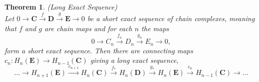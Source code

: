 \documentclass[11.5pt, twoside, a4paper, titlepage]{report}
\theoremstyle{definition}
\theoremstyle{plain}
\newtheorem{thm}[mydef]{Theorem}
\begin{document}
\begin{thm} (Long Exact Sequence) \label{longexactseqthm} \\
Let $0\xrightarrow{}\mathbf{C} \xrightarrow{f} \mathbf{D} \xrightarrow{g} \mathbf{E} \xrightarrow{}0$ be a short exact sequence of chain complexes, meaning that $f$ and $g$ are chain maps and for each $n$ the maps
\begin{equation*}
0 \xrightarrow{} C_n \xrightarrow{f_n} D_n \xrightarrow{g_n} E_n \xrightarrow{} 0,
\end{equation*}
form a short exact sequence. Then there are connecting maps $c_n:H_n(\mathbf{E}) \to H_{n-1}(\mathbf{C})$ giving a long exact sequence, 
\begin{equation*}
\dots \xrightarrow{}H_{n+1}(\mathbf{E}) \xrightarrow{c_{n+1}} H_n(\mathbf{C}) \xrightarrow{f_{\ast}} H_n(\mathbf{D})\xrightarrow{g_{\ast}}H_n(\mathbf{E}) \xrightarrow{c_n} H_{n-1}(\mathbf{C}) \xrightarrow{} \dots
\end{equation*}
\end{thm}
\end{document}
